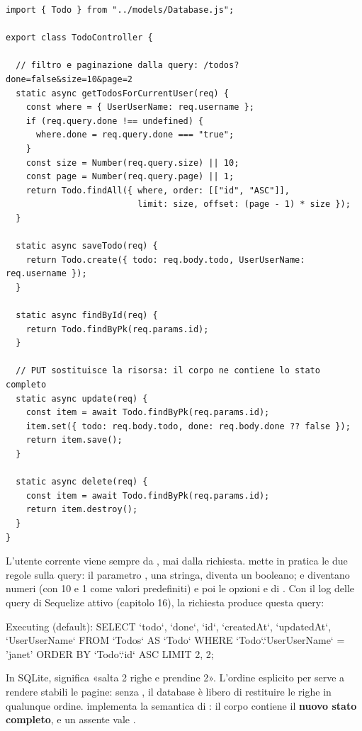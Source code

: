 \begin{lstlisting}[style=js, name=controllers/TodoController.js]
import { Todo } from "../models/Database.js";

export class TodoController {

  // filtro e paginazione dalla query: /todos?done=false&size=10&page=2
  static async getTodosForCurrentUser(req) {
    const where = { UserUserName: req.username };
    if (req.query.done !== undefined) {
      where.done = req.query.done === "true";
    }
    const size = Number(req.query.size) || 10;
    const page = Number(req.query.page) || 1;
    return Todo.findAll({ where, order: [["id", "ASC"]],
                          limit: size, offset: (page - 1) * size });
  }

  static async saveTodo(req) {
    return Todo.create({ todo: req.body.todo, UserUserName: req.username });
  }

  static async findById(req) {
    return Todo.findByPk(req.params.id);
  }

  // PUT sostituisce la risorsa: il corpo ne contiene lo stato completo
  static async update(req) {
    const item = await Todo.findByPk(req.params.id);
    item.set({ todo: req.body.todo, done: req.body.done ?? false });
    return item.save();
  }

  static async delete(req) {
    const item = await Todo.findByPk(req.params.id);
    return item.destroy();
  }
}
\end{lstlisting}

L'utente corrente viene sempre da , mai dalla richiesta.
 mette in pratica le due regole sulla query: il
parametro , una stringa, diventa un booleano;  e
 diventano numeri (con 10 e 1 come valori predefiniti) e poi le
opzioni  e  di . Con il log delle query
di Sequelize attivo (capitolo 16), la richiesta 
produce questa query:

\begin{console}
Executing (default): SELECT `todo`, `done`, `id`, `createdAt`, `updatedAt`, `UserUserName` FROM `Todos` AS `Todo` WHERE `Todo`.`UserUserName` = 'janet' ORDER BY `Todo`.`id` ASC LIMIT 2, 2;
\end{console}

In SQLite,  significa «salta 2 righe e prendine 2». L'ordine
esplicito per  serve a rendere stabili le pagine: senza
, il database è libero di restituire le righe in qualunque
ordine.  implementa la semantica di : il corpo contiene
il \textbf{nuovo stato completo}, e un  assente vale .

